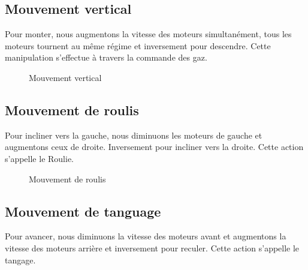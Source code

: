 \documentclass[a4paper,12pt]{report}
\begin{document}
	
	\subsection{Mouvement vertical}
	Pour monter, nous augmentons la vitesse des moteurs simultanément, tous les moteurs tournent au même régime et inversement pour descendre. Cette manipulation s'effectue à travers la commande des gaz.
	\begin{figure} [h]
	\begin{center}
		\centering
	\end{center}
	\caption{Mouvement vertical}
	\end{figure}
	\newpage
	\subsection{Mouvement de roulis}
	Pour incliner vers la gauche, nous diminuons les moteurs de gauche et augmentons ceux de droite. Inversement pour incliner vers la droite. Cette action s’appelle le Roulie.
	\begin{figure} [h]
	\begin{center}
		\caption{Mouvement de roulis}
	\end{center}
	\end{figure}
	\subsection{Mouvement de tanguage}
	Pour avancer, nous diminuons la vitesse des moteurs avant et augmentons la vitesse des moteurs arrière et inversement pour reculer. Cette action s'appelle le tangage.
	
\end{document}
